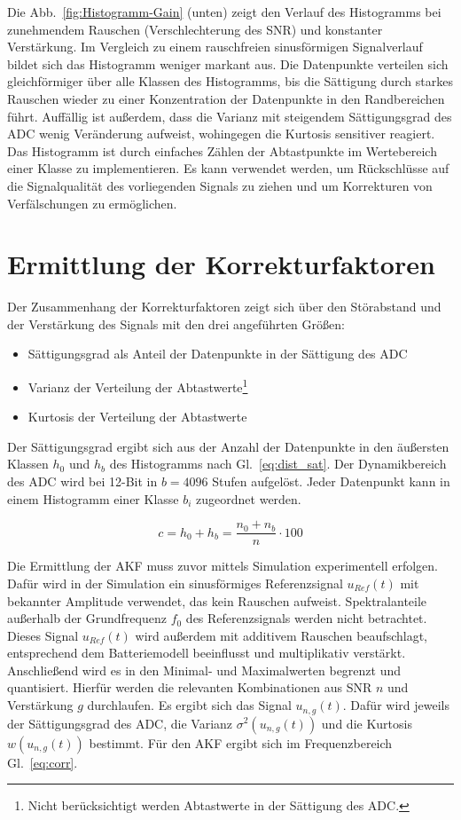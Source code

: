Die Abb.~\ref{fig:Histogramm-Gain} (unten) zeigt den Verlauf des Histogramms bei zunehmendem Rauschen (Verschlechterung des SNR) und konstanter Verstärkung. Im Vergleich zu einem rauschfreien sinusförmigen Signalverlauf bildet sich das Histogramm weniger markant aus. Die Datenpunkte verteilen sich gleichförmiger über alle Klassen des Histogramms, bis die Sättigung durch starkes Rauschen wieder zu einer Konzentration der Datenpunkte in den Randbereichen führt. Auffällig ist außerdem, dass die Varianz mit steigendem Sättigungsgrad des ADC wenig Veränderung aufweist, wohingegen die Kurtosis sensitiver reagiert. Das Histogramm ist durch einfaches Zählen der Abtastpunkte im Wertebereich einer Klasse zu implementieren. Es kann verwendet werden, um Rückschlüsse auf die Signalqualität des vorliegenden Signals zu ziehen und um Korrekturen von Verfälschungen zu ermöglichen. 


\section{Ermittlung der Korrekturfaktoren}
Der Zusammenhang der Korrekturfaktoren zeigt sich über den Störabstand und der Verstärkung des Signals mit den drei angeführten Größen: 
\begin{itemize}
	\item Sättigungsgrad als Anteil der Datenpunkte in der Sättigung des ADC
	\item Varianz der Verteilung der Abtastwerte\footnote[1]{Nicht berücksichtigt werden Abtastwerte in der Sättigung des ADC.\label{foot:bereinigt}}
	\item Kurtosis der Verteilung der Abtastwerte
\end{itemize}

Der Sättigungsgrad ergibt sich aus der Anzahl der Datenpunkte in den äußersten Klassen $h_0$ und $h_b$ des Histogramms nach Gl.~\eqref{eq:dist_sat}. Der Dynamikbereich des ADC wird bei 12-Bit in $b=4096$ Stufen aufgelöst. Jeder Datenpunkt kann in einem Histogramm einer Klasse $b_i$ zugeordnet werden.

\begin{equation}
	\label{eq:dist_sat}
	c = h_0 + h_b = \frac{n_0 + n_b}{n} \cdot 100
\end{equation}

Die Ermittlung der AKF muss zuvor mittels Simulation experimentell erfolgen. 
Dafür wird in der Simulation ein sinusförmiges Referenzsignal $u_{Ref}(t)$ mit bekannter Amplitude verwendet, das kein Rauschen aufweist. Spektralanteile außerhalb der Grundfrequenz $f_0$ des Referenzsignals werden nicht betrachtet. 
Dieses Signal $u_{Ref}(t)$ wird außerdem mit additivem Rauschen beaufschlagt, entsprechend dem Batteriemodell beeinflusst und multiplikativ verstärkt. Anschließend wird es in den Minimal- und Maximalwerten begrenzt und quantisiert. Hierfür werden die relevanten Kombinationen aus SNR $n$ und Verstärkung $g$ durchlaufen. Es ergibt sich das Signal $u_{n,g}(t)$. Dafür wird jeweils der Sättigungsgrad des ADC, die Varianz $\sigma^2(u_{n,g}(t))$ und die Kurtosis $w(u_{n,g}(t))$ bestimmt.
Für den AKF ergibt sich im Frequenzbereich Gl.~\eqref{eq:corr}.

